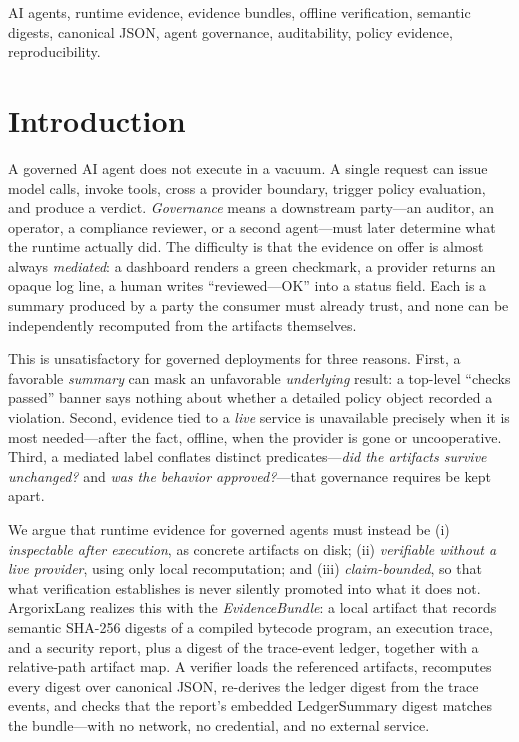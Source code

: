 \documentclass[conference]{IEEEtran}
\newcommand{\Argorix}{%
\textcolor{argViolet}{A}\textcolor{argViolet}{r}\textcolor{argIndigo}{g}\textcolor{argIndigo}{o}\textcolor{argElectric}{r}\textcolor{argElectric}{i}\textcolor{argElectric}{x}\textcolor{argCyan}{L}\textcolor{argCyan}{a}\textcolor{argCyanBright}{n}\textcolor{argCyanBright}{g}\xspace}
\begin{document}
\begin{IEEEkeywords}
AI agents, runtime evidence, evidence bundles, offline verification, semantic digests,
canonical JSON, agent governance, auditability, policy evidence, reproducibility.
\end{IEEEkeywords}

\section{Introduction}\label{sec:intro}
A governed AI agent does not execute in a vacuum. A single request can issue model
calls, invoke tools, cross a provider boundary, trigger policy evaluation, and produce a
verdict. \emph{Governance} means a downstream party---an auditor, an operator, a
compliance reviewer, or a second agent---must later determine what the runtime actually
did. The difficulty is that the evidence on offer is almost always \emph{mediated}: a
dashboard renders a green checkmark, a provider returns an opaque log line, a human
writes ``reviewed---OK'' into a status field. Each is a summary produced by a party the
consumer must already trust, and none can be independently recomputed from the artifacts
themselves.

This is unsatisfactory for governed deployments for three reasons. First, a favorable
\emph{summary} can mask an unfavorable \emph{underlying} result: a top-level ``checks
passed'' banner says nothing about whether a detailed policy object recorded a violation.
Second, evidence tied to a \emph{live} service is unavailable precisely when it is most
needed---after the fact, offline, when the provider is gone or uncooperative. Third, a
mediated label conflates distinct predicates---\emph{did the artifacts survive
unchanged?} and \emph{was the behavior approved?}---that governance requires be kept
apart.

We argue that runtime evidence for governed agents must instead be (i) \emph{inspectable
after execution}, as concrete artifacts on disk; (ii) \emph{verifiable without a live
provider}, using only local recomputation; and (iii) \emph{claim-bounded}, so that what
verification establishes is never silently promoted into what it does not. \Argorix
\cite{venegas2026argorixlang,argorixlang2026} realizes this with the
\emph{EvidenceBundle}: a local artifact that records semantic SHA-256 digests of a
compiled bytecode program, an execution trace, and a security report, plus a digest of
the trace-event ledger, together with a relative-path artifact map. A verifier loads the
referenced artifacts, recomputes every digest over canonical JSON, re-derives the ledger
digest from the trace events, and checks that the report's embedded LedgerSummary digest
matches the bundle---with no network, no credential, and no external service.
\end{document}
